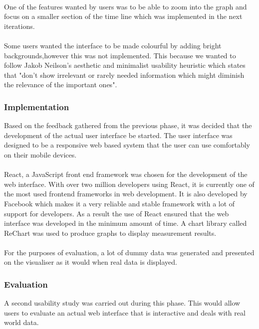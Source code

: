 \paragraph{}
One of the features wanted by users was to be able to zoom into the graph and focus on a smaller section of the time line which was implemented in the next iterations.
\paragraph{}
Some users wanted the interface to be made colourful by adding bright backgrounds,however this was not implemented. This because we wanted to follow Jakob Neilson's aesthetic and minimalist usability heuristic which states that "don't show irrelevant or rarely needed information which might diminish the relevance of the important ones"\cite{Nielsen:1992:FUP:142750.142834}.
\subsubsection{Implementation}
Based on the feedback gathered from the previous phase, it was decided that the development of the actual user interface be started. The user interface was designed to be a responsive web based system that the user can use comfortably on their mobile devices.
\paragraph{}
React, a JavaScript front end framework was chosen for the development of the web interface. With over two million developers using React, it is currently one of the most used frontend frameworks in web development\cite{githubreact}. It is also developed by Facebook which makes it a very reliable and stable framework with a lot of support for developers\cite{githubreact}. As a result the use of React ensured that the web interface was developed in the minimum amount of time. A chart library called ReChart was used to produce graphs to display measurement results.
\paragraph{}
For the purposes of evaluation, a lot of dummy data was generated and presented on the visualiser as it would when real data is displayed.

\subsubsection{Evaluation}
A second usability study was carried out during this phase. This would allow users to evaluate an actual web interface that is interactive and deals with real world data.
